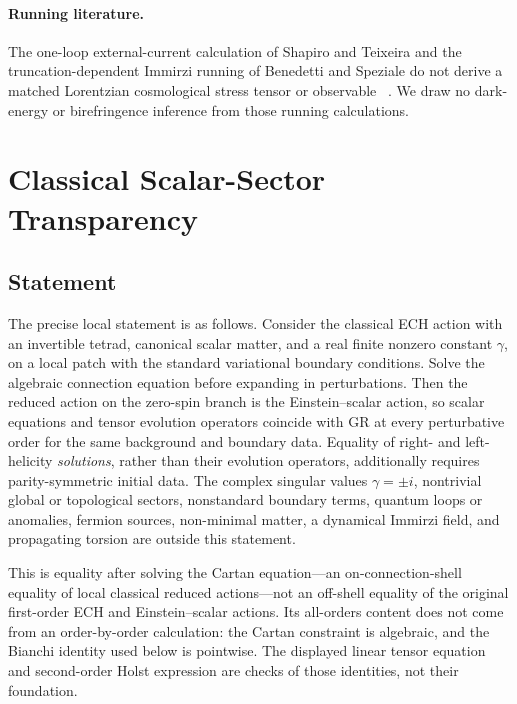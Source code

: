 \documentclass[aps,prd,twocolumn,superscriptaddress,showpacs,preprintnumbers,nofootinbib,longbibliography,floatfix]{revtex4-2}
\begin{document}
\paragraph{Running literature.}
The one-loop external-current calculation of Shapiro and Teixeira and the
truncation-dependent Immirzi running of Benedetti and Speziale do not derive a
matched Lorentzian cosmological stress tensor or observable
~\cite{ShapiroTeixeira2014,BenedettiSpeziale2011run,Benedetti2011}.  We draw no
dark-energy or birefringence inference from those running calculations.

\section{Classical Scalar-Sector Transparency}\label{sec:transparency}

\subsection{Statement}

The precise local statement is as follows.  Consider the classical ECH action
with an invertible tetrad, canonical scalar matter, and a real finite nonzero
constant $\gamma$, on a local patch with the standard variational boundary
conditions.  Solve the algebraic connection equation before expanding in
perturbations.  Then the reduced action on the zero-spin branch is the
Einstein--scalar action, so scalar equations and tensor evolution operators
coincide with GR at every perturbative order for the same background and
boundary data.  Equality of right- and left-helicity \emph{solutions}, rather
than their evolution operators, additionally requires parity-symmetric initial
data.  The complex singular values $\gamma=\pm i$, nontrivial global or
topological sectors, nonstandard boundary terms, quantum loops or anomalies,
fermion sources, non-minimal matter, a dynamical Immirzi field, and
propagating torsion are outside this statement.

This is equality after solving the Cartan equation---an on-connection-shell
equality of local classical reduced actions---not an off-shell equality of the
original first-order ECH and Einstein--scalar actions.  Its all-orders content
does not come from an order-by-order calculation: the Cartan constraint is
algebraic, and the Bianchi identity used below is pointwise.  The displayed
linear tensor equation and second-order Holst expression are checks of those
identities, not their foundation.
\end{document}

